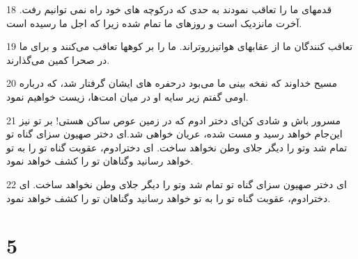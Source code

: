 \par 18 قدمهای ما را تعاقب نمودند به حدی که درکوچه های خود راه نمی توانیم رفت. آخرت مانزدیک است و روزهای ما تمام شده زیرا که اجل ما رسیده است.
\par 19 تعاقب کنندگان ما از عقابهای هواتیزروتراند. ما را بر کوهها تعاقب می‌کنند و برای ما در صحرا کمین می‌گذارند.
\par 20 مسیح خداوند که نفخه بینی ما می‌بود درحفره های ایشان گرفتار شد، که درباره اومی گفتم زیر سایه او در میان امت‌ها، زیست خواهیم نمود.
\par 21 مسرور باش و شادی کن‌ای دختر ادوم که در زمین عوص ساکن هستی! بر تو نیز این‌جام خواهد رسید و مست شده، عریان خواهی شد.‌ای دختر صهیون سزای گناه تو تمام شد وتو را دیگر جلای وطن نخواهد ساخت. ای دخترادوم، عقوبت گناه تو را به تو خواهد رسانید وگناهان تو را کشف خواهد نمود.
\par 22 ‌ای دختر صهیون سزای گناه تو تمام شد وتو را دیگر جلای وطن نخواهد ساخت. ای دخترادوم، عقوبت گناه تو را به تو خواهد رسانید وگناهان تو را کشف خواهد نمود.
 
\chapter{5}

